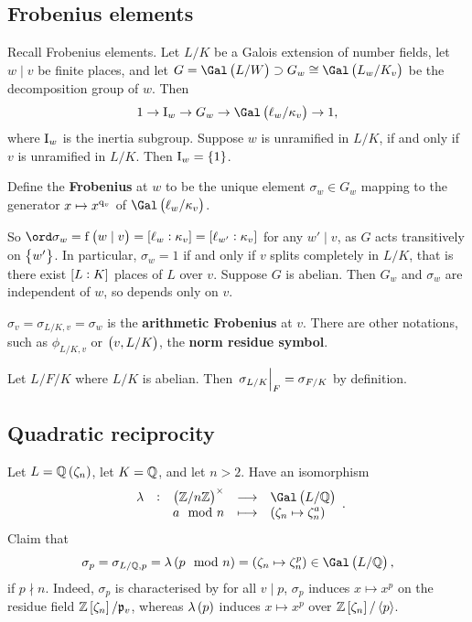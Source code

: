 \pagebreak

\subsection{Frobenius elements}

Recall Frobenius elements. Let $ L / K $ be a Galois extension of number fields, let $ w \mid v $ be finite places, and let $ G = \Gal\br{L / W} \supset G_w \cong \Gal\br{L_w / K_v} $ be the decomposition group of $ w $. Then
$$ 1 \to \I_w \to G_w \to \Gal\br{\ell_w / \kappa_v} \to 1, $$
where $ \mathrm{I}_w $ is the inertia subgroup. Suppose $ w $ is unramified in $ L / K $, if and only if $ v $ is unramified in $ L / K $. Then $ \I_w = \cbr{1} $.

\begin{definition*}
Define the \textbf{Frobenius} at $ w $ to be the unique element $ \sigma_w \in G_w $ mapping to the generator $ x \mapsto x^{\mathrm{q}_v} $ of $ \Gal\br{\ell_w / \kappa_v} $.
\end{definition*}

So $ \ord \sigma_w = \f\br{w \mid v} = \sbr{\ell_w : \kappa_v} = \sbr{\ell_{w'} : \kappa_v} $ for any $ w' \mid v $, as $ G $ acts transitively on $ \cbr{w'} $. In particular, $ \sigma_w = 1 $ if and only if $ v $ splits completely in $ L / K $, that is there exist $ \sbr{L : K} $ places of $ L $ over $ v $. Suppose $ G $ is abelian. Then $ G_w $ and $ \sigma_w $ are independent of $ w $, so depends only on $ v $.

\begin{notation*}
$ \sigma_v = \sigma_{L / K, v} = \sigma_w $ is the \textbf{arithmetic Frobenius} at $ v $. There are other notations, such as $ \phi_{L / K, v} $ or $ \br{v, L / K} $, the \textbf{norm residue symbol}.
\end{notation*}

\begin{remark*}
Let $ L / F / K $ where $ L / K $ is abelian. Then $ \left. \sigma_{L / K} \right|_F = \sigma_{F / K} $ by definition.
\end{remark*}

\subsection{Quadratic reciprocity}

Let $ L = \QQ\br{\zeta_n} $, let $ K = \mathbb{Q} $, and let $ n > 2 $. Have an isomorphism
$$ \function[\lambda]{\br{\ZZ / n\ZZ}^\times}{\Gal\br{L / \QQ}}{a \mod n}{\br{\zeta_n \mapsto \zeta_n^a}}. $$
Claim that
$$ \sigma_p = \sigma_{L / \QQ, p} = \lambda\br{p \mod n} = \br{\zeta_n \mapsto \zeta_n^p} \in \Gal\br{L / \QQ}, $$
if $ p \nmid n $. Indeed, $ \sigma_p $ is characterised by for all $ v \mid p $, $ \sigma_p $ induces $ x \mapsto x^p $ on the residue field $ \ZZ\sbr{\zeta_n} / \ppp_v $, whereas $ \lambda\br{p} $ induces $ x \mapsto x^p $ over $ \ZZ\sbr{\zeta_n} / \abr{p} $.

